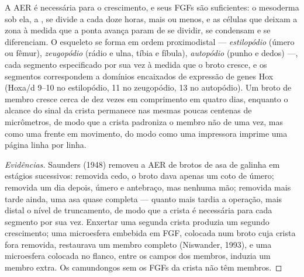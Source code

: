 \begin{proposition}\label{prop:b2:limb-organogenesis:aer}
A AER é necessária para o crescimento, e seus FGFs são suficientes: o
mesoderma sob ela, a \emph{}, se divide a cada doze
horas, mais ou menos, e as células que deixam a zona à medida que a
ponta avança param de se dividir, se condensam e se diferenciam. O
esqueleto se forma em ordem proximodistal --- \emph{estilopódio} (úmero
ou fêmur), \emph{zeugopódio} (rádio e ulna, tíbia e fíbula),
\emph{autopódio} (punho e dedos) ---, cada segmento especificado por sua
vez à medida que o broto cresce, e os segmentos correspondem a domínios
encaixados de expressão de genes Hox (Hoxa/d 9--10 no estilopódio, 11
no zeugopódio, 13 no autopódio). Um broto de membro cresce cerca de dez
vezes em comprimento em quatro dias, enquanto o alcance do sinal da
crista permanece nas mesmas poucas centenas de micrômetros, de modo que
a crista padroniza o membro não de uma vez, mas como uma frente em
movimento, do modo como uma impressora imprime uma página linha por
linha.
\end{proposition}
\begin{proof}[Evidências]
Saunders (1948) removeu a AER de brotos de asa de galinha em estágios
sucessivos: removida cedo, o broto dava apenas um coto de úmero;
removida um dia depois, úmero e antebraço, mas nenhuma mão; removida
mais tarde ainda, uma asa quase completa --- quanto mais tardia a
operação, mais distal o nível de truncamento, de modo que a crista é
necessária para cada segmento por sua vez. Enxertar uma segunda crista
produzia um segundo crescimento; uma microesfera embebida em FGF,
colocada num broto cuja crista fora removida, restaurava um membro
completo (Niswander, 1993), e uma microesfera colocada no flanco, entre
os campos dos membros, induzia um membro extra. Os camundongos sem os
FGFs da crista não têm membros.
\end{proof}

